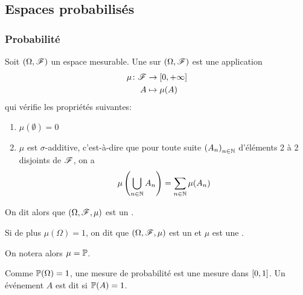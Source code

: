 \subsection{Espaces probabilisés}\label{subsec:1}


\subsubsection{Probabilité}\label{subsubsec:1}
\setcounter{subsection}{0}
\begin{definition}
    Soit \((\Omega, \mathscr{F})\) un espace mesurable. Une
     sur \((\Omega, \mathscr{F})\) est une application
    \begin{equation*}
        \begin{aligned}
            \mu\colon \mathscr{F} &\to \mathopen{}\left[0,+\infty\right]\mathclose{}\\
            A &\mapsto \mu(A)
        \end{aligned}
    \end{equation*}
    qui vérifie les propriétés suivantes:
    \begin{enumerate}
        \item \(\mu(\emptyset) = 0\)
        \item \(\mu\) est \(\sigma\)-additive, c'est-à-dire que pour
        toute suite \({(A_n)}_{n\in\mathbb{N}}\) d'éléments 2 à 2
        disjoints de \(\mathscr{F}\), on a
        \begin{equation*}
            \mu\left(\bigcup_{n\in\mathbb{N}}A_n\right) = \sum_{n\in\mathbb{N}}\mu(A_n)
        \end{equation*}
    \end{enumerate}

    On dit alors que \((\Omega, \mathscr{F},\mu)\) est un .

    Si de plus \(\mu(\Omega) = 1\), on dit que \((\Omega, \mathscr{F},\mu)\)
    est un  et \(\mu\) est une .

    On notera alors \(\mu = \mathbb{P}\).
\end{definition}

\begin{remark}
    Comme \(\mathbb{P}(\Omega)=1\), une mesure de probabilité est une mesure
    dans \(\mathopen{}\left[0,1\right]\mathclose{}\). Un événement \(A\) est dit 
    si \(\mathbb{P}(A) = 1\).
\end{remark}

